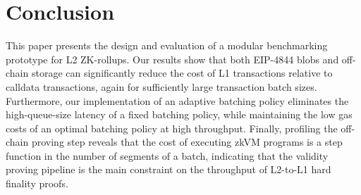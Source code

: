 \section{Conclusion}

This paper presents the design and evaluation of a modular benchmarking prototype for L2 ZK-rollups. Our results show that both EIP-4844 blobs and off-chain storage can significantly reduce the cost of L1 transactions relative to calldata transactions, again for sufficiently large transaction batch sizes. Furthermore, our implementation of an adaptive batching policy eliminates the high-queue-size latency of a fixed batching policy, while maintaining the low gas costs of an optimal batching policy at high throughput. Finally, profiling the off-chain proving step reveals that the cost of executing zkVM programs is a step function in the number of segments of a batch, indicating that the validity proving pipeline is the main constraint on the throughput of L2-to-L1 hard finality proofs.